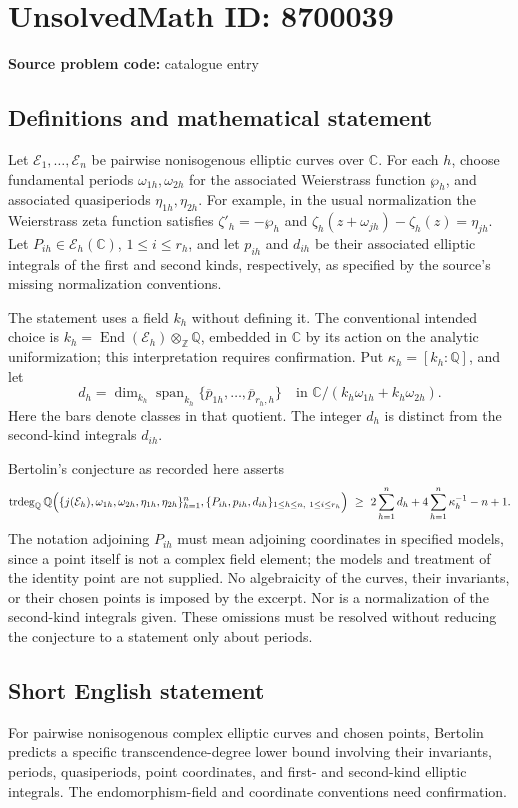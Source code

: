\documentclass[11pt]{article}
\newcommand{\Z}{\mathbb{Z}}
\newcommand{\Q}{\mathbb{Q}}
\newcommand{\C}{\mathbb{C}}
\begin{document}
\section*{UnsolvedMath ID: 8700039}
\textbf{Source problem code:} catalogue entry
\subsection{Definitions and mathematical statement}
Let \(\mathcal E_1,\ldots,\mathcal E_n\) be pairwise nonisogenous elliptic curves over \(\C\). For each \(h\), choose fundamental periods \(\omega_{1h},\omega_{2h}\) for the associated Weierstrass function \(\wp_h\), and associated quasiperiods \(\eta_{1h},\eta_{2h}\). For example, in the usual normalization the Weierstrass zeta function satisfies \(\zeta'_h=-\wp_h\) and \(\zeta_h(z+\omega_{jh})-\zeta_h(z)=\eta_{jh}\). Let \(P_{ih}\in\mathcal E_h(\C)\), \(1\leq i\leq r_h\), and let \(p_{ih}\) and \(d_{ih}\) be their associated elliptic integrals of the first and second kinds, respectively, as specified by the source's missing normalization conventions.

The statement uses a field \(k_h\) without defining it. The conventional intended choice is \(k_h=\operatorname{End}(\mathcal E_h)\otimes_\Z\Q\), embedded in \(\C\) by its action on the analytic uniformization; this interpretation requires confirmation. Put \(\kappa_h=[k_h:\Q]\), and let
\[
 d_h=\dim_{k_h}\operatorname{span}_{k_h}
 \{\overline p_{1h},\ldots,\overline p_{r_h,h}\}
 \quad\text{in }\C/(k_h\omega_{1h}+k_h\omega_{2h}).
\]
Here the bars denote classes in that quotient. The integer \(d_h\) is distinct from the second-kind integrals \(d_{ih}\).

Bertolin's conjecture as recorded here asserts
\[
 \operatorname{trdeg}_{\Q}\Q\Bigl(
 \{j(\mathcal E_h),\omega_{1h},\omega_{2h},\eta_{1h},\eta_{2h}\}_{h=1}^n,
 \{P_{ih},p_{ih},d_{ih}\}_{1\leq h\leq n,\ 1\leq i\leq r_h}
 \Bigr)
 \ \geq\ 2\sum_{h=1}^n d_h+4\sum_{h=1}^n\kappa_h^{-1}-n+1.
\]
The notation adjoining \(P_{ih}\) must mean adjoining coordinates in specified models, since a point itself is not a complex field element; the models and treatment of the identity point are not supplied. No algebraicity of the curves, their invariants, or their chosen points is imposed by the excerpt. Nor is a normalization of the second-kind integrals given. These omissions must be resolved without reducing the conjecture to a statement only about periods.
\subsection{Short English statement}
For pairwise nonisogenous complex elliptic curves and chosen points, Bertolin predicts a specific transcendence-degree lower bound involving their invariants, periods, quasiperiods, point coordinates, and first- and second-kind elliptic integrals. The endomorphism-field and coordinate conventions need confirmation.
\end{document}

